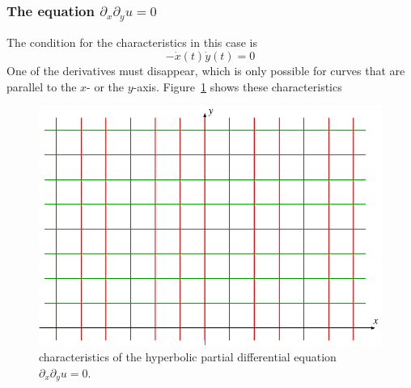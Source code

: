 \subsubsection{The equation $\partial_x\partial_yu=0$}
The condition for the characteristics in this case is
\[
-\dot x(t)\dot y(t)=0
\]
One of the derivatives must disappear, which is only possible for
curves that are parallel to the $x$- or the $y$-axis.
Figure~\ref{hyp:dxdy} shows these characteristics
\begin{figure}
\centering
\includegraphics{9-hyperbolic/images/dxdy.pdf}
\caption{characteristics of the hyperbolic partial differential equation
$\partial_x\partial_yu=0$.
\label{hyp:dxdy}}
\end{figure}

